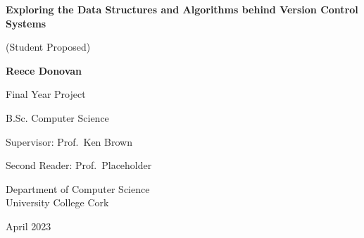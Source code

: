 \documentclass[12pt]{report}
\begin{document}

\begin{titlepage}
  \begin{center}
    \vspace*{\fill}

    \textbf{\LARGE{Exploring the Data Structures and Algorithms behind Version Control Systems}}

    \medskip
    \large{(Student Proposed)}

    \vspace{1.3cm}
    \textbf{\Large{Reece Donovan}}

    \vspace{1.3cm}
    \large{Final Year Project}

    \large{B.Sc. Computer Science}

    \vspace{1.4cm}
    \large{Supervisor: Prof.\ Ken Brown}

    \large{Second Reader: Prof.\ Placeholder}

    \vspace{1.45cm}

    \normalsize{Department of Computer Science}\\
    \normalsize{University College Cork}

    \vspace{1.5cm}
    \large{April 2023}

    \vspace*{\fill}
  \end{center}
\end{titlepage}


\newpage

\newpage

\tableofcontents
\newpage
{}

\newpage

\newpage

\newpage

\newpage

\newpage

\newpage

\end{document}
